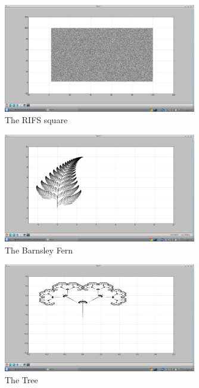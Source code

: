 \begin{figure}[tbh]
\begin{center}
\includegraphics[width=0.75\textwidth]{square.png}
\end{center}
\caption{The RIFS square\label{fig:gprun}}
\end{figure}

\begin{figure}[tbh]
\begin{center}
\includegraphics[width=0.75\textwidth]{b_fern.png}
\end{center}
\caption{The Barnsley Fern\label{fig:gprun}}
\end{figure}

\begin{figure}[tbh]
\begin{center}
\includegraphics[width=0.75\textwidth]{tree.png}
\end{center}
\caption{The Tree\label{fig:gprun}}
\end{figure}



